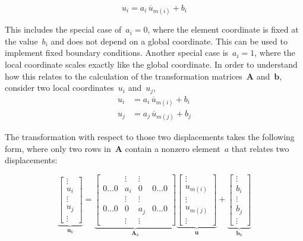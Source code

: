 \begin{equation}
u_{i} = a_{i}\,\overline{u}_{m(i)} + b_{i}
\end{equation}

This includes the special case of~$a_{i} = 0$, where the element coordinate is fixed at the value~$b_{i}$ and does not depend on a global coordinate.
This can be used to implement fixed boundary conditions.
Another special case is~$a_{i} = 1$, where the local coordinate scales exactly like the global coordinate.
In order to understand how this relates to the calculation of the transformation matrices~$\boldsymbol{A}$ and~$\boldsymbol{b}$, consider two local coordinates~$u_{i}$ and~$u_{j}$,
%
\begin{align*}
u_{i} &= a_{i}\,\overline{u}_{m(i)} + b_{i} \\
u_{j} &= a_{j}\,\overline{u}_{m(j)} + b_{j}
\end{align*}

The transformation with respect to those two displacements takes the following form, where only two rows in~$\boldsymbol{A}$ contain a nonzero element~$a$ that relates two displacements:

$$
\underbrace{
\begin{bmatrix}
\vdots \\ u_{i} \\ \vdots \\ u_{j} \\ \vdots
\end{bmatrix}
}_{\boldsymbol{u}_{k}}
=
\underbrace{
\begin{bmatrix}
& \vdots & \vdots & \\
0 \hdots 0 & a_{i} & 0 & 0 \hdots 0 \\
& \vdots & \vdots & \\
0 \hdots 0 & 0 & a_{j} & 0 \hdots 0 \\
& \vdots & \vdots &
\end{bmatrix}
}_{\boldsymbol{A}_{k}}
\underbrace{
\begin{bmatrix}
\vdots \\ u_{m(i)} \\ \vdots \\ u_{m(j)} \\ \vdots
\end{bmatrix}
}_{\boldsymbol{u}}
+
\underbrace{
\begin{bmatrix}
\vdots \\ b_{i} \\ \vdots \\ b_{j} \\ \vdots
\end{bmatrix}
}_{\boldsymbol{b}_{k}}
$$

